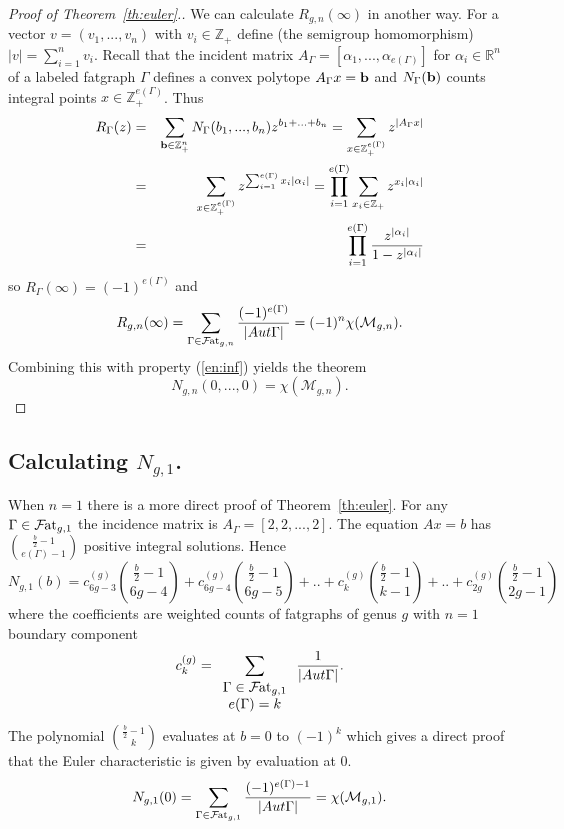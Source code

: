 \documentclass{amsart}
\newcommand{\br}{\mathbb{R}}
\newcommand{\bz}{\mathbb{Z}}
\newcommand{\modm}{\mathcal{M}}
\newcommand{\f}{\mathcal{F}}
\newcommand{\fat}{\f\hspace{-.3mm}{\rm at}_{g,n}}
\newcommand{\fato}{\f\hspace{-.3mm}{\rm at}}
\begin{document}
\begin{proof}[Proof of Theorem~\ref{th:euler}.]
We can calculate $R_{g,n}(\infty)$ in another way. For a vector $v=(v_1,...,v_n)$ with $v_i\in\bz_+$ define (the semigroup homomorphism) $|v|=\sum_{i=1}^nv_i$.  Recall that the incident matrix $A_{\Gamma}=[\alpha_1,...,\alpha_{e(\Gamma)}]$ for $\alpha_i\in\br^n$ of a labeled fatgraph $\Gamma$ defines a convex polytope $A_{\Gamma}x={\bf b}$ and $N_{\Gamma}({\bf b})$ counts integral points $x\in\bz_+^{e(\Gamma)}$.  Thus
\begin{eqnarray*}
R_{\Gamma}(z)&=&\sum_{{\bf b}\in\bz_+^n}N_{\Gamma}(b_1,...,b_n)z^{b_1+...+b_n}=
\sum_{x\in\bz_+^{e(\Gamma)}}z^{|A_{\Gamma}x|}\\
&=&\sum_{x\in\bz_+^{e(\Gamma)}}z^{\sum_{i=1}^{e(\Gamma)}x_i|\alpha_i|}
=\prod_{i=1}^{e(\Gamma)}\sum_{x_i\in\bz_+}z^{x_i|\alpha_i|}\\
&=&\prod_{i=1}^{e(\Gamma)}\frac{z^{|\alpha_i|}}{1-z^{|\alpha_i|}}
\end{eqnarray*}
so $R_{\Gamma}(\infty)=(-1)^{e(\Gamma)}$ and
\[ R_{g,n}(\infty)=\sum_{\Gamma\in \fat}\frac{(-1)^{e(\Gamma)}}{|Aut\Gamma|}=(-1)^n\chi(\modm_{g,n}).\]
Combining this with property (\ref{en:inf}) yields the theorem
\[ N_{g,n}(0,...,0)=\chi(\modm_{g,n}).\]
\end{proof}

\subsection{Calculating $N_{g,1}$.} 
When $n=1$ there is a more direct proof of Theorem~\ref{th:euler}.  For any $\Gamma\in\fato_{g,1}$ the incidence matrix is $A_{\Gamma}=[2,2,...,2]$.  The equation $Ax=b$ has $\binom{\frac{b}{2}-1}{e(\Gamma)-1}$ positive integral solutions.  Hence
\[N_{g,1}(b)=c_{6g-3}^{(g)}\binom{\frac{b}{2}-1}{6g-4}+c_{6g-4}^{(g)}\binom{\frac{b}{2}-1}{6g-5}+..+c_k^{(g)}\binom{\frac{b}{2}-1}{k-1}+..+c_{2g}^{(g)}\binom{\frac{b}{2}-1}{2g-1}\]
where the coefficients are weighted counts of fatgraphs of genus $g$ with $n=1$ boundary component
\[ c_k^{(g)}=\sum_{\begin{array}{c}\Gamma\in\fato_{g,1}\\e(\Gamma)=k\end{array}}\frac{1}{|Aut\Gamma|}.\]
The polynomial $\binom{\frac{b}{2}-1}{k}$ evaluates at $b=0$ to $(-1)^k$ which gives a direct proof that the Euler characteristic is given by evaluation at 0.
\[N_{g,1}(0)=\sum_{\Gamma\in\fato_{g,1}}\frac{(-1)^{e(\Gamma)-1}}{|Aut\Gamma|}=\chi(\modm_{g,1}).\]
\end{document}
